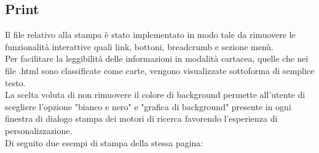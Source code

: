 \documentclass{article}
\begin{document}
\subsection{Print}
Il file relativo alla stampa è stato implementato in modo tale da rimuovere le funzionalità interattive quali link, bottoni, breadcrumb e sezione menù.\\
Per facilitare la leggibilità delle informazioni in modalità cartacea, quelle che nei file .html sono classificate come carte, vengono visualizzate sottoforma di semplice testo.\\
La scelta voluta di non rimuovere il colore di background permette all'utente di scegliere l'opzione "bianco e nero" e "grafica di background" presente in ogni finestra di dialogo stampa dei motori di ricerca favorendo l'esperienza di personalizzazione.\\
Di seguito due  esempi di stampa della stessa pagina:
\end{document}
